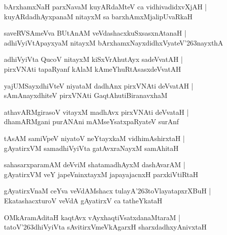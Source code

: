 \documentclass[twoside,12pt,openright]{book}
\def\S{\char'263}
\newcounter{shloka}[chapter]
\begin{document}
\begin{shloka}
bArxhamxNaH parxNavaM kuyARdaMteV ca vidhivadidxvXjAH |\\
kuyARdadhAyxpanaM nitayxM  sa barxhAmxMjalipUvaRkaH 
\end{shloka}

\begin{shloka}
saveRVSAmeVva BUtAnAM veVdashacxkuSxsasxnAtanaH |\\
adhiVyiVtApayxyaM nitayxM bArxhamxNayxdidhxVyateV\S nayxthA 
\end{shloka}

\begin{shloka}
adhiVyiVta QucoV nitayxM kiSxVrAhutAyx sadeVvatAH |\\
pirxVNAti tapaRyanf kAlaM kAmeYhuRtAsasxdeVvatAH 
\end{shloka}

\begin{shloka}
yajUMSayxdhiVteV niyataM dadhAnx pirxVNAti deVvatAH |\\
sAmAnayxdhiteV pirxVNAti GaqtAhutiBiranavxhaM 
\end{shloka}

\begin{shloka}
athavARMgirasoV vitayxM madhAvx pirxVNAti deVvataH |\\
dhamARMgani purANAni mAMseYsatxpaRyateV surAnf 
\end{shloka}

\begin{shloka}
tAsAM samiVpeV niyatoV neYtayxkaM vidhimAshirxtaH |\\
gAyatirxVM samadhiVyiVta gatAvxraNayxM samAhitaH 
\end{shloka}

\begin{shloka}
sahasarxparamAM deVviM shatamadhAyxM dashAvarAM |\\
gAyatirxVM veY japeVninxtayxM japayajacnxH parxkiVtiRtaH 
\end{shloka}

\begin{shloka}
gAyatirxVnaM ceYva veVdAMshacx tulayA\S toVlayatapxrXBuH |\\
EkatashacxturoV veVdA gAyatirxV ca tatheYkataH
\end{shloka}

\begin{shloka}
OMkAramAditaH kaqtAvx vAyxhaqtiVsatxdanaMtaraM |\\
tatoV\S dhiVyiVta sAvitirxVmeVkAgarxH sharxdadhxyAnivxtaH
\end{shloka}
\end{document}
